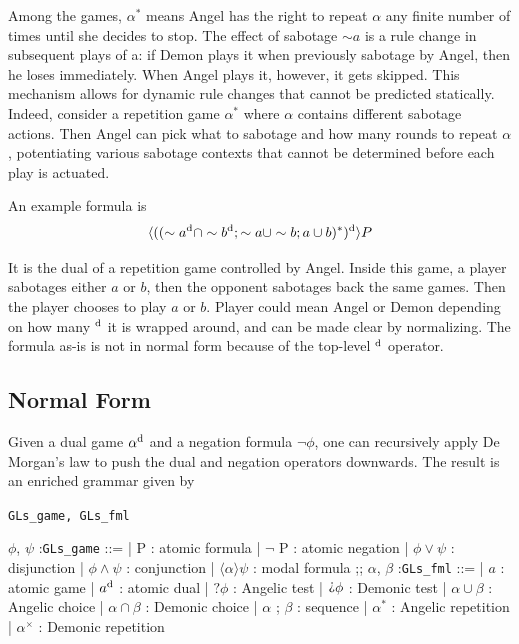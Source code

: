 Among the games, $\alpha^*$ means Angel has the right to repeat $\alpha$ any finite number of times until she decides to stop. The effect of sabotage $\sim a$ is a rule change in subsequent plays of a: if Demon plays it when previously sabotage by Angel, then he loses immediately. When Angel plays it, however, it gets skipped. This mechanism allows for dynamic rule changes that cannot be predicted statically. Indeed, consider a repetition game $\alpha^*$ where $\alpha$ contains different sabotage actions. Then Angel can pick what to sabotage and how many rounds to repeat $\alpha$, potentiating various sabotage contexts that cannot be determined before each play is actuated.

\begin{example}
\label{ex:GLs_notnormal}
    An example \GLs{} formula is 
    \begin{equation}
        \label{eqn:example_GLs}
            \langle((\sim a^\text{d} \cap \sim b^\text{d} ; \sim a\cup \sim b; a\cup b)^*)^\text{d}\rangle P
    \end{equation}
\end{example}

It is the dual of a repetition game controlled by Angel. Inside this game, a player sabotages either $a$ or $b$, then the opponent sabotages back the same games. Then the player chooses to play $a$ or $b$. Player could mean Angel or Demon depending on how many $^\text{d}$ it is wrapped around, and can be made clear by normalizing. The formula as-is is not in normal form because of the top-level $^\text{d}$ operator.

\subsection{Normal Form}
Given a dual \GLs{} game $\alpha^\text{d}$ and a negation formula $\neg \phi$, one can recursively apply De Morgan's law to push the dual and negation operators downwards. The result is an enriched grammar given by
\begin{center}
\begin{bdefinition}
\label{def:GLs_syntax}
\texttt{GLs\_game, GLs\_fml}

    \begin {bnf}
        $\phi$, $\psi$ :\texttt{GLs\_game} ::=
        | P : atomic formula
        | $\neg$ P : atomic negation
        | $\phi \vee\psi$ : disjunction
        | $\phi \wedge \psi$ : conjunction
        | $\langle\alpha\rangle \psi$ : modal formula
        ;;
        $\alpha$, $\beta$ :\texttt{GLs\_fml} ::=
        | $a$ : atomic game
        | $a^\text{d}$ : atomic dual
        | $?\phi$ : Angelic test
        | $\DTest \phi$ : Demonic test
        | $\alpha\cup\beta$ : Angelic choice
        | $\alpha\cap\beta$ : Demonic choice
        | $\alpha$ ; $\beta$ : sequence
        | $\alpha^*$ : Angelic repetition
        | $\alpha^\times$ : Demonic repetition
    \end{bnf}
\end{bdefinition}
\end{center}

